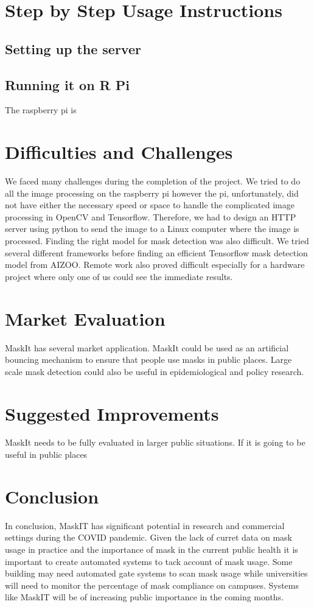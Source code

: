 \documentclass[conference, 12pt, onecolumn]{IEEEtran}
\begin{document}
\section{Step by Step Usage Instructions}
\subsection{Setting up the server}

\subsection{Running it on R Pi}

The raspberry pi is 

\section{Difficulties and Challenges}
We faced many challenges during the completion of the project. We tried to do all the image processing on the raspberry pi however the pi, unfortunately, did not have either the necessary speed or space to handle the complicated image processing in OpenCV and Tensorflow. Therefore, we had to design an HTTP server using python to send the image to a Linux computer where the image is processed. Finding the right model for mask detection was also difficult. We tried several different frameworks before finding an efficient Tensorflow mask detection model from AIZOO. Remote work also proved difficult especially for a hardware project where only one of us could see the immediate results.
\section{Market Evaluation}
MaskIt has several market application. MaskIt could be used as an artificial bouncing mechanism to ensure that people use masks in public places. Large scale mask detection could also be useful in epidemiological and policy research. 
\section{Suggested Improvements}
MaskIt needs to be fully evaluated in larger public situations. If it is going to be useful in public places 
\section{Conclusion}
In conclusion, MaskIT has significant potential in research and commercial settings during the COVID pandemic. Given the lack of curret data on mask usage in practice and the importance of mask in the current public health it is important to create automated systems to tack account of mask usage. Some building may need automated gate systems to scan mask usage while universities will need to monitor the percentage of mask compliance on campuses. Systems like MaskIT will be of increasing public importance in the coming months. 



\end{document}
